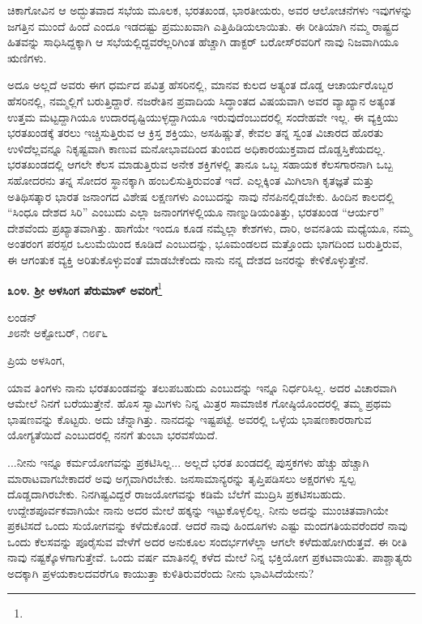 ಚಿಕಾಗೋವಿನ ಆ ಅದ್ಭುತವಾದ ಸಭೆಯ ಮೂಲಕ, ಭರತಖಂಡ, ಭಾರತೀಯರು, ಅವರ ಆಲೋಚನೆಗಳು\enginline{-} ಇವುಗಳನ್ನು ಜಗತ್ತಿನ ಮುಂದೆ ಹಿಂದೆ ಎಂದೂ ಇಡದಷ್ಟು ಪ್ರಮುಖವಾಗಿ ಎತ್ತಿಹಿಡಿಯಲಾಯಿತು. ಈ ರೀತಿಯಾಗಿ ನಮ್ಮ ರಾಷ್ಟ್ರದ ಹಿತವನ್ನು ಸಾಧಿಸಿದ್ದಕ್ಕಾಗಿ ಆ ಸಭೆಯಲ್ಲಿದ್ದವರೆಲ್ಲರಿಗಿಂತ ಹೆಚ್ಚಾಗಿ ಡಾಕ್ಟರ್ ಬರೋಸ್‌ರವರಿಗೆ ನಾವು ನಿಜವಾಗಿಯೂ ಋಣಿಗಳು.
\vspace{0.2cm}

ಅದೂ ಅಲ್ಲದೆ ಅವರು ಈಗ ಧರ್ಮದ ಪವಿತ್ರ ಹೆಸರಿನಲ್ಲಿ, ಮಾನವ ಕುಲದ ಅತ್ಯಂತ ದೊಡ್ಡ ಆಚಾರ್ಯರೊಬ್ಬರ ಹೆಸರಿನಲ್ಲಿ, ನಮ್ಮಲ್ಲಿಗೆ ಬರುತ್ತಿದ್ದಾರೆ. ನಜರೇತಿನ ಪ್ರವಾದಿಯ ಸಿದ್ಧಾಂತದ ವಿಷಯವಾಗಿ ಅವರ ವ್ಯಾಖ್ಯಾನ ಅತ್ಯಂತ ಉತ್ತಮ ಮಟ್ಟದ್ದಾಗಿಯೂ ಉದಾರದೃಷ್ಟಿಯುಳ್ಳದ್ದಾಗಿಯೂ ಇರುವುದೆಂಬುದರಲ್ಲಿ ಸಂದೇಹವೇ ಇಲ್ಲ. ಈ ವ್ಯಕ್ತಿಯು ಭರತಖಂಡಕ್ಕೆ ತರಲು ಇಚ್ಚಿಸುತ್ತಿರುವ ಆ ಕ್ರಿಸ್ತ ಶಕ್ತಿಯು, ಅಸಹಿಷ್ಣುತೆ, ಕೇವಲ ತನ್ನ ಸ್ವಂತ ವಿಚಾರದ ಹೊರತು ಉಳಿದೆಲ್ಲವನ್ನೂ ನಿಕೃಷ್ಟವಾಗಿ ಕಾಣುವ ಮನೋಭಾವದಿಂದ ತುಂಬಿದ ಅಧಿಕಾರಯುಕ್ತವಾದ ದೊಡ್ಡಸ್ತಿಕೆಯದಲ್ಲ. ಭರತಖಂಡದಲ್ಲಿ ಆಗಲೇ ಕೆಲಸ ಮಾಡುತ್ತಿರುವ ಅನೇಕ ಶಕ್ತಿಗಳಲ್ಲಿ ತಾನೂ ಒಬ್ಬ ಸಹಾಯಕ ಕೆಲಸಗಾರನಾಗಿ ಒಬ್ಬ ಸಹೋದರನು ತನ್ನ ಸೋದರ ಸ್ಥಾನಕ್ಕಾಗಿ ಹಂಬಲಿಸುತ್ತಿರುವಂತೆ ಇದೆ. ಎಲ್ಲಕ್ಕಿಂತ ಮಿಗಿಲಾಗಿ ಕೃತಜ್ಞತೆ ಮತ್ತು ಅತಿಥಿಸತ್ಕಾರ ಭಾರತ ಜನಾಂಗದ ವಿಶೇಷ ಲಕ್ಷಣಗಳು ಎಂಬುದನ್ನು ನಾವು ನೆನಪಿನಲ್ಲಿಡಬೇಕು. ಹಿಂದಿನ ಕಾಲದಲ್ಲಿ “ಸಿಂಧೂ ದೇಶದ ಸಿರಿ” ಎಂಬುದು ಎಲ್ಲಾ ಜನಾಂಗಗಳಲ್ಲಿಯೂ ನಾಣ್ನುಡಿಯಂತಿತ್ತು, ಭರತಖಂಡ “ಆರ್ಯರ” ದೇಶವೆಂದು ಪ್ರಖ್ಯಾತವಾಗಿತ್ತು. ಹಾಗೆಯೇ ಇಂದೂ ಕೂಡ ನಮ್ಮೆಲ್ಲಾ ಕೇಶಗಳು, ದಾರಿ, ಅವನತಿಯ ಮಧ್ಯೆಯೂ, ನಮ್ಮ ಅಂತರಂಗ ಪರಸ್ಪರ ಒಲುಮೆಯಿಂದ ಕೂಡಿದೆ ಎಂಬುದನ್ನು, ಭೂಮಂಡಲದ ಮತ್ತೊಂದು ಭಾಗದಿಂದ ಬರುತ್ತಿರುವ, ಈ ಆಗಂತುಕ ವ್ಯಕ್ತಿ ಅರಿತುಕೊಳ್ಳುವಂತೆ ಮಾಡಬೇಕೆಂದು ನಾನು ನನ್ನ ದೇಶದ ಜನರನ್ನು ಕೇಳಿಕೊಳ್ಳುತ್ತೇನೆ.

\begin{center}
\textbf{೩೦೪. ಶ‍್ರೀ ಅಳಸಿಂಗ ಪೆರುಮಾಳ್ ಅವರಿಗೆ}\footnote{}
\end{center}

\begin{flushright}
ಲಂಡನ್\\೨೮ನೇ ಅಕ್ಟೋಬರ್, ೧೮೯೬
\end{flushright}

\noindent
ಪ್ರಿಯ ಅಳಸಿಂಗ,

ಯಾವ ತಿಂಗಳು ನಾನು ಭರತಖಂಡವನ್ನು ತಲುಪಬಹುದು ಎಂಬುದನ್ನು ಇನ್ನೂ ನಿರ್ಧರಿಸಿಲ್ಲ. ಅದರ ವಿಚಾರವಾಗಿ ಆಮೇಲೆ ನಿನಗೆ ಬರೆಯುತ್ತೇನೆ. ಹೊಸ ಸ್ವಾಮಿಗಳು ನಿನ್ನ ಮಿತ್ರರ ಸಾಮಾಜಿಕ ಗೋಷ್ಠಿಯೊಂದರಲ್ಲಿ ತಮ್ಮ ಪ್ರಥಮ ಭಾಷಣವನ್ನು ಕೊಟ್ಟರು. ಅದು ಚೆನ್ನಾಗಿತ್ತು. ನಾನದನ್ನು ಇಷ್ಟಪಟ್ಟೆ. ಅವರಲ್ಲಿ ಒಳ್ಳೆಯ ಭಾಷಣಕಾರರಾಗುವ ಯೋಗ್ಯತೆಯಿದೆ ಎಂಬುದರಲ್ಲಿ ನನಗೆ ತುಂಬಾ ಭರವಸೆಯಿದೆ.

...ನೀನು ಇನ್ನೂ ಕರ್ಮಯೋಗವನ್ನು ಪ್ರಕಟಿಸಿಲ್ಲ... ಅಲ್ಲದೆ ಭರತ ಖಂಡದಲ್ಲಿ ಪುಸ್ತಕಗಳು ಹೆಚ್ಚು ಹೆಚ್ಚಾಗಿ ಮಾರಾಟವಾಗಬೇಕಾದರೆ ಅವು ಅಗ್ಗವಾಗಿರಬೇಕು. ಜನಸಾಮಾನ್ಯರನ್ನು ತೃಪ್ತಿಪಡಿಸಲು ಅಕ್ಷರಗಳು ಸ್ವಲ್ಪ ದೊಡ್ಡದಾಗಿರಬೇಕು. ನಿನಗಿಷ್ಟವಿದ್ದರೆ ರಾಜಯೋಗವನ್ನು ಕಡಿಮೆ ಬೆಲೆಗೆ ಮುದ್ರಿಸಿ ಪ್ರಕಟಿಸಬಹುದು. ಉದ್ದೇಶಪೂರ್ವಕವಾಗಿಯೇ ನಾನು ಅದರ ಮೇಲೆ ಹಕ್ಕನ್ನು ಇಟ್ಟುಕೊಳ್ಳಲಿಲ್ಲ. ನೀನು ಅದನ್ನು ಮುಂಚಿತವಾಗಿಯೇ ಪ್ರಕಟಿಸದೆ ಒಂದು ಸುಯೋಗವನ್ನು ಕಳೆದುಕೊಂಡೆ. ಆದರೆ ನಾವು ಹಿಂದೂಗಳು ಎಷ್ಟು ಮಂದಗತಿಯವರೆಂದರೆ ನಾವು ಒಂದು ಕೆಲಸವನ್ನು ಪೂರೈಸುವ ವೇಳೆಗೆ ಅದರ ಅನುಕೂಲ ಸಂದರ್ಭಗಳೆಲ್ಲಾ ಆಗಲೇ ಕಳೆದುಹೋಗಿರುತ್ತವೆ. ಈ ರೀತಿ ನಾವು ನಷ್ಟಕ್ಕೊಳಗಾಗುತ್ತೇವೆ. ಒಂದು ವರ್ಷ ಮಾತಿನಲ್ಲಿ ಕಳೆದ ಮೇಲೆ ನಿನ್ನ ಭಕ್ತಿಯೋಗ ಪ್ರಕಟವಾಯಿತು. ಪಾಶ್ಚಾತ್ಯರು ಅದಕ್ಕಾಗಿ ಪ್ರಳಯಕಾಲದವರೆಗೂ ಕಾಯುತ್ತಾ ಕುಳಿತಿರುವರೆಂದು ನೀನು ಭಾವಿಸಿದೆಯೇನು?

